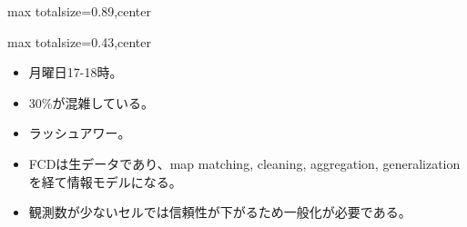 \begin{minipage}[t]{0.58\textwidth}
\begin{adjustbox}{max totalsize={\textwidth}{0.89\textheight},center}
\begin{minipage}{\textwidth}
\end{minipage}
\end{adjustbox}
\end{minipage}


\clearpage
{}
\begin{minipage}[t]{0.405\textwidth}
\begin{adjustbox}{max totalsize={\textwidth}{0.43\textheight},center}
\begin{minipage}{\textwidth}\scriptsize
{}\begin{itemize}
\item 月曜日17-18時。
\item 30\%が混雑している。
\item ラッシュアワー。
\end{itemize}\begin{itemize}
\item FCDは生データであり、map matching, cleaning, aggregation, generalization を経て情報モデルになる。
\item 観測数が少ないセルでは信頼性が下がるため一般化が必要である。
\end{itemize}
\end{minipage}
\end{adjustbox}
\end{minipage}\hfill
